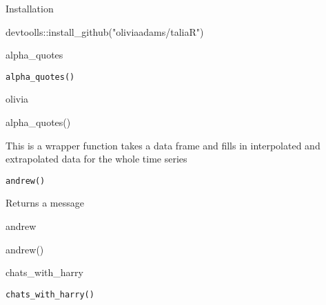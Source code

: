 \documentclass[a4paper]{book}
\begin{document}
%
\begin{Section}{Installation}

devtoolls::install\_github("oliviaadams/taliaR")
\end{Section}
%
\begin{Description}\relax
alpha\_quotes
\end{Description}
%
\begin{Usage}
\begin{verbatim}
alpha_quotes()
\end{verbatim}
\end{Usage}
%
\begin{Author}\relax
olivia
\end{Author}
%
\begin{Examples}
\begin{ExampleCode}
alpha_quotes()

\end{ExampleCode}
\end{Examples}
%
\begin{Description}\relax
This is a wrapper function takes a data frame and fills in
interpolated and extrapolated data for the whole time series
\end{Description}
%
\begin{Usage}
\begin{verbatim}
andrew()
\end{verbatim}
\end{Usage}
%
\begin{Value}
Returns a message
\end{Value}
%
\begin{Author}\relax
andrew
\end{Author}
%
\begin{Examples}
\begin{ExampleCode}
andrew()

\end{ExampleCode}
\end{Examples}
%
\begin{Description}\relax
chats\_with\_harry
\end{Description}
%
\begin{Usage}
\begin{verbatim}
chats_with_harry()
\end{verbatim}
\end{Usage}
\end{document}
